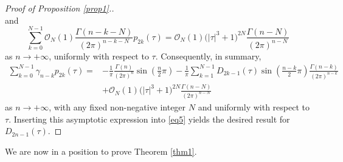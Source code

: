 \begin{proof}[Proof of Proposition \ref{prop1}.]
\[\]
and
\[
\sum_{k = 0}^{N - 1} \mathcal{O}_N(1) \frac{\Gamma (n - k - N)}{(2\pi )^{n - k - N} }p_{2k} (\tau )=\mathcal{O}_N (1)\bigl(\left| \tau \right|^3 + 1\bigr)^{2N} \frac{\Gamma (n - N)}{(2\pi )^{n - N}}
\]
as $n\to+\infty$, uniformly with respect to $\tau$. Consequently, in summary,
\begin{align*}
\sum_{k = 0}^{N - 1} \gamma _{n - k} p_{2k} (\tau ) ={}& -\frac{1}{\pi}\frac{\Gamma (n)}{(2\pi )^n } \sin \left( \frac{n}{2}\pi \right) -\frac{1}{\pi}\sum_{k = 1}^{N - 1} D_{2k - 1} (\tau )\sin \left( \frac{n - k}{2}\pi \right)\frac{\Gamma (n - k)}{(2\pi )^{n - k}} \\ & +\mathcal{O}_N (1)\bigl(\left| \tau \right|^3 + 1\bigr)^{2N} \frac{\Gamma (n - N)}{(2\pi )^{n - N}}
\end{align*}
as $n\to+\infty$, with any fixed non-negative integer $N$ and uniformly with respect to $\tau$. Inserting this asymptotic expression into \eqref{eq5} yields the desired result for $D_{2n - 1} (\tau )$.
\end{proof}

We are now in a position to prove Theorem \ref{thm1}.

